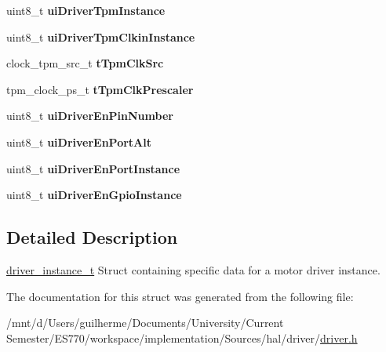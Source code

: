 \begin{DoxyCompactItemize}
\item 
\hypertarget{structdriver__instance__t_a44663bfa878853938f1bdad536fd35b7}{uint8\-\_\-t {\bfseries ui\-Driver\-Tpm\-Instance}}\label{structdriver__instance__t_a44663bfa878853938f1bdad536fd35b7}

\item 
\hypertarget{structdriver__instance__t_a0b559c218b89af667912f82edd458734}{uint8\-\_\-t {\bfseries ui\-Driver\-Tpm\-Clkin\-Instance}}\label{structdriver__instance__t_a0b559c218b89af667912f82edd458734}

\item 
\hypertarget{structdriver__instance__t_ad76cc0556b525758d279459843138f5b}{clock\-\_\-tpm\-\_\-src\-\_\-t {\bfseries t\-Tpm\-Clk\-Src}}\label{structdriver__instance__t_ad76cc0556b525758d279459843138f5b}

\item 
\hypertarget{structdriver__instance__t_ab2d6b0a24053ce8936798d00e0eaa788}{tpm\-\_\-clock\-\_\-ps\-\_\-t {\bfseries t\-Tpm\-Clk\-Prescaler}}\label{structdriver__instance__t_ab2d6b0a24053ce8936798d00e0eaa788}

\item 
\hypertarget{structdriver__instance__t_a418300ea7942514884c5b6edef97f223}{uint8\-\_\-t {\bfseries ui\-Driver\-En\-Pin\-Number}}\label{structdriver__instance__t_a418300ea7942514884c5b6edef97f223}

\item 
\hypertarget{structdriver__instance__t_a2abe6b120f62dc6c75ee3e34b314d205}{uint8\-\_\-t {\bfseries ui\-Driver\-En\-Port\-Alt}}\label{structdriver__instance__t_a2abe6b120f62dc6c75ee3e34b314d205}

\item 
\hypertarget{structdriver__instance__t_a63e440f47a54aab7dc11895e6a29113d}{uint8\-\_\-t {\bfseries ui\-Driver\-En\-Port\-Instance}}\label{structdriver__instance__t_a63e440f47a54aab7dc11895e6a29113d}

\item 
\hypertarget{structdriver__instance__t_acd040855556543782b527796bcd7b1b4}{uint8\-\_\-t {\bfseries ui\-Driver\-En\-Gpio\-Instance}}\label{structdriver__instance__t_acd040855556543782b527796bcd7b1b4}

\end{DoxyCompactItemize}


\subsection{Detailed Description}
\hyperlink{structdriver__instance__t}{driver\-\_\-instance\-\_\-t} Struct containing specific data for a motor driver instance. 

The documentation for this struct was generated from the following file\-:\begin{DoxyCompactItemize}
\item 
/mnt/d/\-Users/guilherme/\-Documents/\-University/\-Current Semester/\-E\-S770/workspace/implementation/\-Sources/hal/driver/\hyperlink{driver_8h}{driver.\-h}\end{DoxyCompactItemize}
